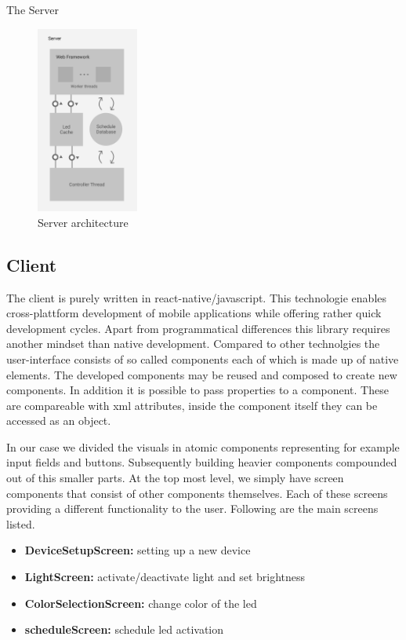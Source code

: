 \documentclass[conference]{IEEEtran}
\begin{document}
The Server
\begin{figure}[H]
    \centering
    \includegraphics[width=0.3\textwidth]{server_architecture}
    \caption{Server architecture}
\end{figure}

\subsection{Client}
The client is purely written in react-native/javascript. This technologie enables cross-plattform development of mobile applications 
while offering rather quick development cycles. Apart from programmatical differences this library requires another mindset than 
native development. Compared to other technolgies the user-interface consists of so called components each of which is made up of
native elements. The developed components may be reused and composed to create new components. In addition it is possible to pass
properties to a component. These are compareable with xml attributes, inside the component itself they can be accessed as an object. 

In our case we divided the visuals in atomic components representing for example input fields and buttons. Subsequently building
heavier components compounded out of this smaller parts. At the top most level, we simply have screen components that consist of 
other components themselves. Each of these screens providing a different functionality to the user. Following are the main screens
listed.

\begin{itemize}
    \item \textbf{DeviceSetupScreen:} setting up a new device
    \item \textbf{LightScreen:} activate/deactivate light and set brightness
    \item \textbf{ColorSelectionScreen:} change color of the led
    \item \textbf{scheduleScreen:} schedule led activation 
\end{itemize}
\vspace{5pt}
\end{document}
